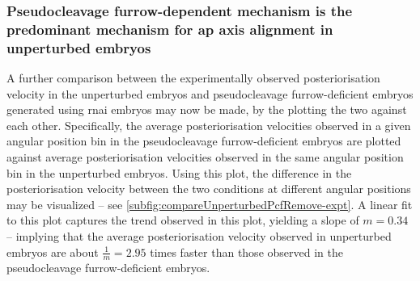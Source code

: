 
\FloatBarrier
\subsubsection{Pseudocleavage furrow-dependent mechanism is the predominant mechanism for \acs{ap} axis alignment in unperturbed embryos}\label{subsubsec:pcFurrowDominatesConclude}

A further comparison between the experimentally observed posteriorisation velocity in the unperturbed embryos and pseudocleavage furrow-deficient embryos generated using  \ac{rnai} embryos may now be made, by the plotting the two against each other. Specifically, the average posteriorisation velocities observed in a given angular position bin in the pseudocleavage furrow-deficient embryos are plotted against average posteriorisation velocities observed in the same angular position bin in the unperturbed embryos. Using this plot, the difference in the posteriorisation velocity between the two conditions at different angular positions may be visualized -- see \autoref{subfig:compareUnperturbedPcfRemove-expt}. A linear fit to this plot captures the trend observed in this plot, yielding a slope of $m = \num{0.34}$ -- implying that the average posteriorisation velocity observed in unperturbed embryos are about $\frac{1}{m} = \num{2.95}$ times faster than those observed in the pseudocleavage furrow-deficient embryos. 

